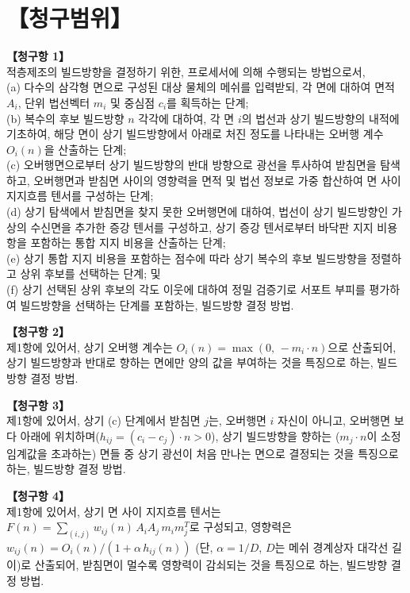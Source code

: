 \documentclass[11pt,a4paper]{article}
\begin{document}
\newpage
\section*{【청구범위】}

\textbf{【청구항 1】}\\
적층제조의 빌드방향을 결정하기 위한, 프로세서에 의해 수행되는 방법으로서,\\
(a) 다수의 삼각형 면으로 구성된 대상 물체의 메쉬를 입력받되, 각 면에 대하여 면적
$A_i$, 단위 법선벡터 $m_i$ 및 중심점 $c_i$를 획득하는 단계;\\
(b) 복수의 후보 빌드방향 $n$ 각각에 대하여, 각 면 $i$의 법선과 상기 빌드방향의
내적에 기초하여, 해당 면이 상기 빌드방향에서 아래로 처진 정도를 나타내는 오버행
계수 $O_i(n)$을 산출하는 단계;\\
(c) 오버행면으로부터 상기 빌드방향의 반대 방향으로 광선을 투사하여 받침면을 탐색하고,
오버행면과 받침면 사이의 영향력을 면적 및 법선 정보로 가중 합산하여 면 사이 지지흐름
텐서를 구성하는 단계;\\
(d) 상기 탐색에서 받침면을 찾지 못한 오버행면에 대하여, 법선이 상기 빌드방향인 가상의
수신면을 추가한 증강 텐서를 구성하고, 상기 증강 텐서로부터 바닥판 지지 비용 항을
포함하는 통합 지지 비용을 산출하는 단계;\\
(e) 상기 통합 지지 비용을 포함하는 점수에 따라 상기 복수의 후보 빌드방향을 정렬하고
상위 후보를 선택하는 단계; 및\\
(f) 상기 선택된 상위 후보의 각도 이웃에 대하여 정밀 검증기로 서포트 부피를 평가하여
빌드방향을 선택하는 단계를 포함하는, 빌드방향 결정 방법.

\medskip
\textbf{【청구항 2】}\\
제1항에 있어서, 상기 오버행 계수는 $O_i(n)=\max(0,\,-m_i\cdot n)$으로 산출되어,
상기 빌드방향과 반대로 향하는 면에만 양의 값을 부여하는 것을 특징으로 하는, 빌드방향
결정 방법.

\medskip
\textbf{【청구항 3】}\\
제1항에 있어서, 상기 (c) 단계에서 받침면 $j$는, 오버행면 $i$ 자신이 아니고, 오버행면
보다 아래에 위치하며($h_{ij}=(c_i-c_j)\cdot n>0$), 상기 빌드방향을 향하는
($m_j\cdot n$이 소정 임계값을 초과하는) 면들 중 상기 광선이 처음 만나는 면으로
결정되는 것을 특징으로 하는, 빌드방향 결정 방법.

\medskip
\textbf{【청구항 4】}\\
제1항에 있어서, 상기 면 사이 지지흐름 텐서는
$F(n)=\sum_{(i,j)} w_{ij}(n)\,A_iA_j\,m_im_j^{T}$로 구성되고, 영향력은
$w_{ij}(n)=O_i(n)/(1+\alpha\,h_{ij}(n))$ (단, $\alpha=1/D$, $D$는 메쉬 경계상자
대각선 길이)로 산출되어, 받침면이 멀수록 영향력이 감쇠되는 것을 특징으로 하는,
빌드방향 결정 방법.
\end{document}
